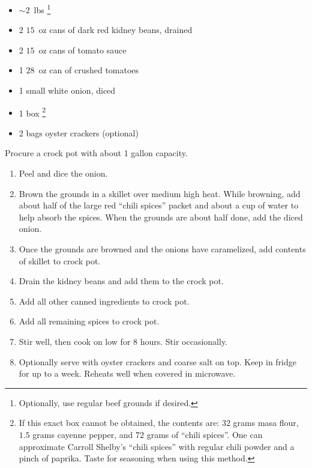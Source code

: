 \documentclass{article}
\begin{document}
\thispagestyle{firstpage}



\ingredients
\begin{itemize}
    \renewcommand{\thefootnote}{\arabic{footnote}}
    \item $\sim 2$~lbs \renewcommand{\thefootnote}{\fnsymbol{footnote}}\footnote[2]{Optionally, use regular beef grounds if desired.}
    \item 2 $15$~oz cans of dark red kidney beans, drained
    \item 2 $15$~oz cans of tomato sauce
    \item 1 $28$~oz can of crushed tomatoes
    \item 1 small white onion, diced
    \renewcommand{\thefootnote}{\arabic{footnote}}
    \item 1 box \renewcommand{\thefootnote}{\fnsymbol{footnote}}\footnote[3]{If this exact box cannot be obtained, the contents are: $32$ grams masa flour, $1.5$ grams cayenne pepper, and $72$ grams of ``chili spices''. One can approximate Carroll Shelby's ``chili spices'' with regular chili powder and a pinch of paprika. Taste for seasoning when using this method.}

    \item 2 bags oyster crackers (optional)
\end{itemize}

\instructions
Procure a crock pot with about 1 gallon capacity.
\begin{enumerate}
    \item Peel and dice the onion.
    \item Brown the grounds in a skillet over medium high heat. While browning, add about half of the large red ``chili spices'' packet and about a cup of water to help absorb the spices. When the grounds are about half done, add the diced onion.
    \item Once the grounds are browned and the onions have caramelized, add contents of skillet to crock pot.
    \item Drain the kidney beans and add them to the crock pot.
    \item Add all other canned ingredients to crock pot.
    \item Add all remaining spices to crock pot.
    \item Stir well, then cook on low for 8 hours. Stir occasionally.
    \item Optionally serve with oyster crackers and coarse salt on top. Keep in fridge for up to a week. Reheats well when covered in microwave.
\end{enumerate}
\renewcommand{\thefootnote}{\arabic{footnote}}
\spewfootnotes
\end{document}
